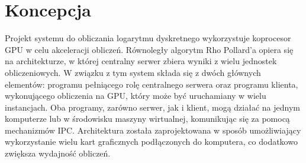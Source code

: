 \section{Koncepcja}

Projekt systemu do obliczania logarytmu dyskretnego wykorzystuje koprocesor GPU w celu akceleracji obliczeń.
Równoległy algorytm Rho Pollard'a opiera się na architekturze, w której centralny serwer zbiera wyniki
z wielu jednostek obliczeniowych. W związku z tym system składa się z dwóch głównych elementów:
programu pełniącego rolę centralnego serwera oraz programu klienta, wykonującego obliczenia na GPU,
który może być uruchamiany w wielu instancjach.
Oba programy, zarówno serwer, jak i klient, mogą działać na jednym komputerze
lub w środowisku maszyny wirtualnej, komunikując się za pomocą mechanizmów IPC.
Architektura została zaprojektowana w sposób umożliwiający wykorzystanie wielu kart graficznych
podłączonych do komputera, co dodatkowo zwiększa wydajność obliczeń.

